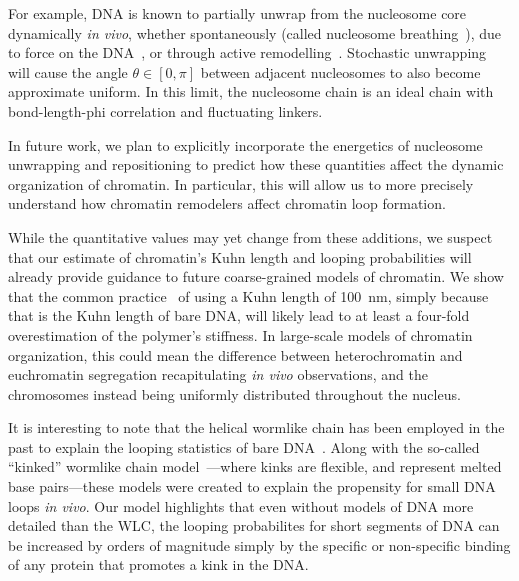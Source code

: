 \documentclass[%
 reprint,
superscriptaddress,
showpacs,preprintnumbers,
 amsmath,amssymb,
 aps,
 prl,
]{revtex4-1}
\begin{document}
    For example, DNA is known to partially unwrap from the nucleosome core dynamically \textit{in
    vivo}, whether spontaneously (called nucleosome breathing~\cite{TODO}), due to
    force on the DNA~\cite{TODO}, or through active
    remodelling~\cite{dion2007,kulaeva2007,senavirathne2017}. Stochastic
    unwrapping will cause the angle $\theta \in [0, \pi]$ between adjacent nucleosomes to
    also become approximate uniform. In this limit, the nucleosome chain is an
    ideal chain with bond-length-phi correlation and fluctuating linkers. 
    
    In future work, we plan to explicitly incorporate the energetics of nucleosome unwrapping
    and repositioning to predict how these quantities affect the dynamic
    organization of chromatin. In particular, this will allow us to more
    precisely understand how chromatin remodelers affect chromatin loop
    formation.

While the quantitative values may yet change from these additions, we suspect that our estimate of chromatin's Kuhn length and looping probabilities will already provide
    guidance to future coarse-grained models of chromatin.
We show that the common practice~\cite{macphersonInPress,nuebler2018}
    of using a Kuhn length of \SI{100}{\nano\metre}, simply because that is the
    Kuhn length of bare DNA, will likely lead to at least a four-fold
    overestimation of the polymer's stiffness. %
In large-scale models of chromatin organization, this could mean the difference
    between heterochromatin and euchromatin segregation recapitulating
    \textit{in vivo} observations, and the chromosomes instead being uniformly
    distributed throughout the nucleus.

It is interesting to note that the helical wormlike chain has been employed
    in the past to explain the looping statistics of bare DNA~\cite{shimada1984,
    liu2011a}.
Along with the so-called ``kinked'' wormlike chain model~\cite{wiggins2005,
    popov2005}---where kinks are flexible, and represent melted base
    pairs---these models were created to explain the propensity for small DNA
    loops \textit{in vivo}.
Our model highlights that even without models of DNA more detailed than the WLC,
    the looping probabilites for short segments of DNA can be increased by
    orders of magnitude simply by the specific or non-specific binding of any
    protein that promotes a kink in the DNA.\@
\end{document}
